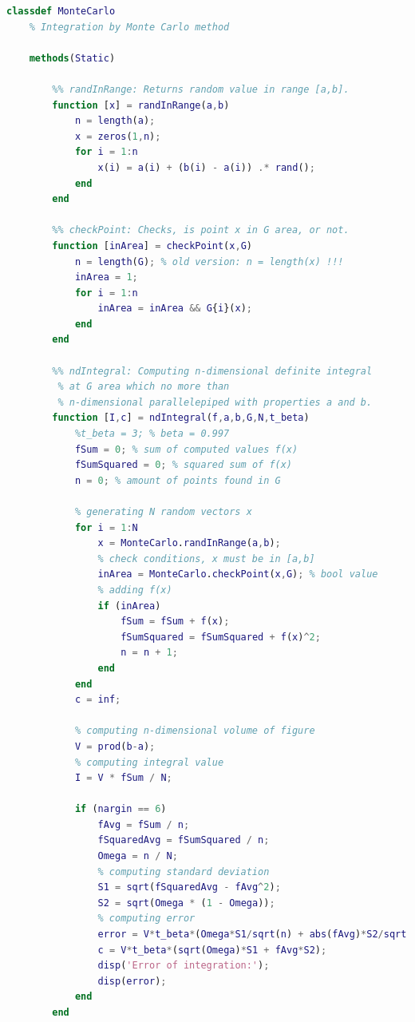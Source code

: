 \documentclass[a4paper,12pt]{article}
\begin{document}
\begin{lstlisting}[language=MATLAB]
classdef MonteCarlo
    % Integration by Monte Carlo method

    methods(Static)
        
        %% randInRange: Returns random value in range [a,b].
        function [x] = randInRange(a,b)
            n = length(a);
            x = zeros(1,n);
            for i = 1:n
                x(i) = a(i) + (b(i) - a(i)) .* rand();
            end
        end
        
        %% checkPoint: Checks, is point x in G area, or not.
        function [inArea] = checkPoint(x,G)
            n = length(G); % old version: n = length(x) !!!
            inArea = 1;
            for i = 1:n
                inArea = inArea && G{i}(x);
            end
        end
        
        %% ndIntegral: Computing n-dimensional definite integral 
         % at G area which no more than 
         % n-dimensional parallelepiped with properties a and b.
        function [I,c] = ndIntegral(f,a,b,G,N,t_beta)
            %t_beta = 3; % beta = 0.997
            fSum = 0; % sum of computed values f(x)
            fSumSquared = 0; % squared sum of f(x)
            n = 0; % amount of points found in G
            
            % generating N random vectors x
            for i = 1:N
                x = MonteCarlo.randInRange(a,b);
                % check conditions, x must be in [a,b]
                inArea = MonteCarlo.checkPoint(x,G); % bool value
                % adding f(x)
                if (inArea)
                    fSum = fSum + f(x);
                    fSumSquared = fSumSquared + f(x)^2;
                    n = n + 1;
                end
            end
            c = inf;
            
            % computing n-dimensional volume of figure
            V = prod(b-a);
            % computing integral value
            I = V * fSum / N;
            
            if (nargin == 6)
                fAvg = fSum / n;
                fSquaredAvg = fSumSquared / n;
                Omega = n / N;
                % computing standard deviation
                S1 = sqrt(fSquaredAvg - fAvg^2);
                S2 = sqrt(Omega * (1 - Omega));
                % computing error
                error = V*t_beta*(Omega*S1/sqrt(n) + abs(fAvg)*S2/sqrt(N));
                c = V*t_beta*(sqrt(Omega)*S1 + fAvg*S2);
                disp('Error of integration:');
                disp(error);
            end
        end
        

\end{lstlisting}
\end{document}
